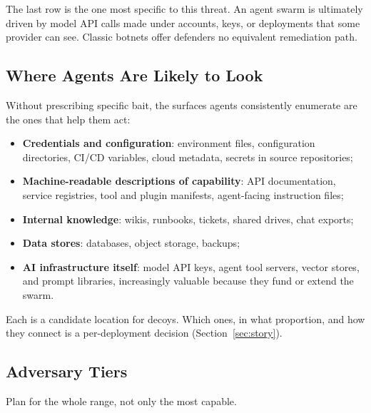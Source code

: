 \documentclass[11pt,letterpaper]{article}
\begin{document}
The last row is the one most specific to this threat. An agent swarm is ultimately driven by model API calls made under accounts, keys, or deployments that some provider can see. Classic botnets offer defenders no equivalent remediation path.

\subsection{Where Agents Are Likely to Look}
\label{sec:look}

Without prescribing specific bait, the surfaces agents consistently enumerate are the ones that help them act:

\begin{itemize}
  \item \textbf{Credentials and configuration}: environment files, configuration directories, CI/CD variables, cloud metadata, secrets in source repositories;
  \item \textbf{Machine-readable descriptions of capability}: API documentation, service registries, tool and plugin manifests, agent-facing instruction files;
  \item \textbf{Internal knowledge}: wikis, runbooks, tickets, shared drives, chat exports;
  \item \textbf{Data stores}: databases, object storage, backups;
  \item \textbf{AI infrastructure itself}: model API keys, agent tool servers, vector stores, and prompt libraries, increasingly valuable because they fund or extend the swarm.
\end{itemize}

Each is a candidate location for decoys. Which ones, in what proportion, and how they connect is a per-deployment decision (Section~\ref{sec:story}).

\subsection{Adversary Tiers}
\label{sec:tiers}

Plan for the whole range, not only the most capable.
\end{document}

